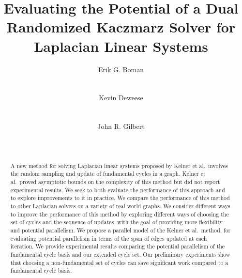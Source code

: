 \documentclass{sig-alternate}
\begin{document}
\title{Evaluating the Potential of a Dual Randomized Kaczmarz Solver for Laplacian Linear Systems}



\author{
\alignauthor
Erik G. Boman\footnotemark[1]\\
\\
       \\
\alignauthor
Kevin Deweese\footnotemark[2]\\
\\       
\\
\alignauthor 
John R. Gilbert\footnotemark[2]\\
\\
\\
}


\maketitle
{}
\begin{abstract}
A new method for solving
Laplacian linear systems proposed by Kelner et al.\ involves the
random sampling and update of fundamental cycles
in a graph.
Kelner et al.\ proved asymptotic bounds on the complexity of
this method but did not report experimental results.
We seek to both evaluate the performance of this
approach and to explore improvements to it in practice.
We compare the performance of this method to other Laplacian
solvers
on a variety of real
world graphs.
We consider different ways to improve
the performance of this method by exploring
different ways of choosing the set of cycles and
the sequence of updates, with
the goal of providing more flexibility and potential parallelism.
We propose a parallel
model of the Kelner et al.\ method, for evaluating
potential parallelism in terms of the span of edges updated at
each iteration.
We provide experimental results comparing the potential parallelism
of the fundamental cycle basis and our extended cycle set.
Our preliminary experiments show that choosing a non-fundamental
set of cycles
can save significant work compared to a fundamental cycle basis.
\end{abstract}
\end{document}
